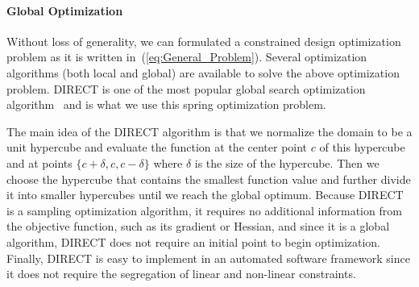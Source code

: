 \documentclass[10pt]{article}
\begin{document}
\paragraph{Global Optimization} Without loss of generality, we can formulated a constrained design optimization problem as it is written in~(\ref{eq:General_Problem}). Several optimization algorithms (both local and global) are available to solve the above optimization problem. DIRECT is one of the most popular global search optimization algorithm~\cite{DirectUserGuide,DirectPaper} and is what we use this spring optimization problem.

The main idea of the DIRECT algorithm is that we normalize the domain to be a unit hypercube and evaluate the function at the center point $c$ of this hypercube and at points $\{c + \delta, c, c - \delta\}$ where $\delta$ is the size of the hypercube. Then we choose the hypercube that contains the smallest function value and further divide it into smaller hypercubes until we reach the global optimum. Because DIRECT is a sampling optimization algorithm, it requires no additional information from the objective function, such as its gradient or Hessian, and since it is a global algorithm, DIRECT does not require an initial point to begin optimization. Finally, DIRECT is easy to implement in an automated software framework since it does not require the segregation of linear and non-linear constraints.
\end{document}

